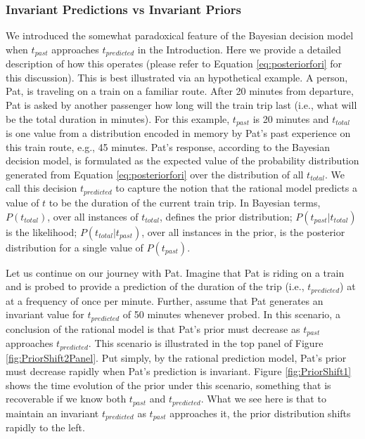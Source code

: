 \subsubsection{Invariant Predictions vs Invariant Priors}
We introduced the somewhat paradoxical feature of the Bayesian decision model when $t_{past}$ approaches $t_{predicted}$ in the Introduction.  Here we provide a detailed description of how this operates (please refer to Equation \ref{eq:posteriorfori} for this discussion).    This is best illustrated via an hypothetical example.  A person, Pat, is traveling on a train on a familiar route. After 20 minutes from departure, Pat is asked by another passenger how long will the train trip last (i.e., what will be the total duration in minutes).  For this example, $t_{past}$ is 20 minutes and $t_{total}$ is one value from a distribution encoded in memory by Pat's past experience on this train route, e.g., 45 minutes. Pat's response, according to the Bayesian decision model, is formulated as the expected value of the probability distribution generated from Equation \ref{eq:posteriorfori} over the distribution of all $t_{total}$. We call this decision $t_{predicted}$ to capture the notion that the rational model predicts a value of $t$ to be the duration of the current train trip.  In Bayesian terms, $P(t_{total})$, over all instances of $t_{total}$, defines the prior distribution; $P(t_{past} \vert t_{total})$ is the likelihood; $P(t_{total} \vert t_{past})$, over all instances in the prior, is the posterior distribution for a single value of $P(t_{past})$.

Let us continue on our journey with Pat.  Imagine that Pat is riding on a train and is probed to provide a prediction of the duration of the trip (i.e., $t_{predicted}$) at at a frequency of once per minute.  Further, assume that Pat generates an invariant value for $t_{predicted}$ of 50 minutes whenever probed.  In this scenario, a conclusion of the rational model is that Pat's prior must decrease as $t_{past}$ approaches $t_{predicted}$. This scenario is illustrated in the top panel of Figure \ref{fig:PriorShift2Panel}.  Put simply, by the rational prediction model, Pat's prior must decrease rapidly when Pat's prediction is invariant.  Figure \ref{fig:PriorShift1} shows the time evolution of the prior under this scenario, something that is recoverable if we know both $t_{past}$ and $t_{predicted}$. What we see here is that to maintain an invariant $t_{predicted}$ as $t_{past}$ approaches it, the prior distribution shifts rapidly to the left.   

